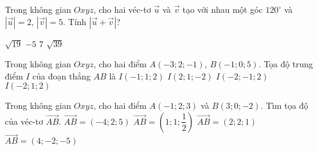 \begin{ex}%
	Trong không gian $Oxyz$, cho hai véc-tơ $\overrightarrow{u}$ và $\overrightarrow{v}$ tạo với nhau một góc $120^{\circ}$ và $\left|{\overrightarrow{u}}\right|=2$, $\left|{\overrightarrow{v}}\right|=5$. Tính $\left|{\overrightarrow{u} + \overrightarrow{v}}\right|$?

	\choice
	{\True $\sqrt{19}$}
	{$-5$}
	{$7$}
	{$\sqrt{39}$}


\end{ex}

\begin{ex}%
	Trong không gian $Oxyz$, cho hai điểm $A(-3;2;-1)$, $B(-1;0;5)$. Tọa độ trung điểm $I$ của đoạn thẳng $AB$ là
	\choice
	{$I(-1;1;2)$}
	{$I(2;1;-2)$}
	{$I(-2;-1;2)$}
	{\True $I(-2;1;2)$}
	\end{ex}

\begin{ex}%
	Trong không gian $Oxyz$, cho hai điểm $A(-1;2;3)$ và $B(3;0;-2)$. Tìm tọa độ của véc-tơ $\overrightarrow{AB}$.
	\choice
	{$\overrightarrow{AB}=\left(-4;2;5\right)$}
	{$\overrightarrow{AB}=\left(1;1;\dfrac{1}{2}\right)$}
	{$\overrightarrow{AB}=\left(2;2;1\right)$}
	{\True $\overrightarrow{AB}=\left(4;-2;-5\right)$}
\end{ex}

